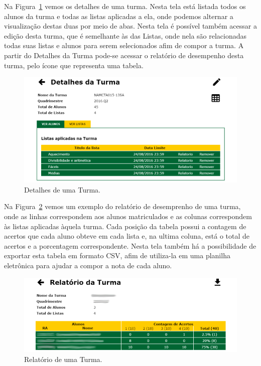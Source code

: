 \documentclass[
	12pt,				%
	openany,
	oneside,
	a4paper,			%
	english,			%
	brazil				%
	]{abntex2}
\begin{document}
  Na Figura~\ref{print:profTurmaDetalhes} vemos os detalhes de uma turma. Nesta tela está listada todos os alunos da turma e todas as listas aplicadas a ela, onde podemos alternar a visualização destas duas por meio de abas. Nesta tela é possível também acessar a edição desta turma, que é semelhante às das Listas, onde nela são relacionadas todas suas listas e alunos para serem selecionados afim de compor a turma. A partir do Detalhes da Turma pode-se acessar o relatório de desempenho desta turma, pelo ícone que representa uma tabela.

\begin{figure}[H]
  \centering
  \includegraphics[width=\textwidth]{prints/profTurmaDetalhes.png}
  \caption{Detalhes de uma Turma.}
  \label{print:profTurmaDetalhes}
  \vspace{-0.5cm}
\end{figure}

  Na Figura~\ref{print:profRelatorioTurma} vemos um exemplo do relatório de desemprenho de uma turma, onde as linhas correspondem aos alunos matriculados e as colunas correspondem às listas aplicadas àquela turma. Cada posição da tabela possui a contagem de acertos que cada aluno obteve em cada lista e, na ultima coluna, está o total de acertos e a porcentagem correspondente. Nesta tela também há a possibilidade de exportar esta tabela em formato CSV, afim de utiliza-la em uma planilha eletrônica para ajudar a compor a nota de cada aluno.
  
\begin{figure}[H]
  \centering
  \includegraphics[width=\textwidth]{prints/profRelatorioTurma.png}
  \caption{Relatório de uma Turma.}
  \label{print:profRelatorioTurma}
  \vspace{-0.5cm}
\end{figure} 
\end{document}
